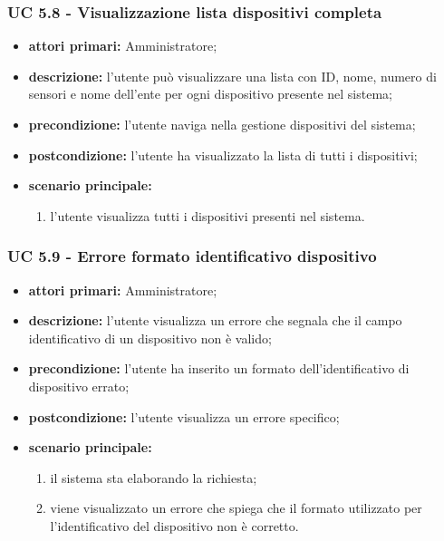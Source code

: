 			\subsubsection{UC 5.8 - Visualizzazione lista dispositivi completa}
			\begin{itemize}
				\item \textbf{attori primari:} Amministratore;
				\item \textbf{descrizione:} l'utente può visualizzare una lista con ID, nome, numero di sensori e nome dell'ente per ogni dispositivo presente nel sistema;
				\item \textbf{precondizione:} l'utente naviga nella gestione dispositivi del sistema;
				\item \textbf{postcondizione:} l'utente ha visualizzato la lista di tutti i dispositivi;
				\item \textbf{scenario principale:}
				\begin{enumerate}
					\item{l'utente visualizza tutti i dispositivi presenti nel sistema.}
				\end{enumerate}
			\end{itemize}

			\subsubsection{UC 5.9 - Errore formato identificativo dispositivo}
			\begin{itemize}
				\item \textbf{attori primari:} Amministratore;
				\item \textbf{descrizione:} l'utente visualizza un errore che segnala che il campo identificativo di un dispositivo non è valido;
				\item \textbf{precondizione:} l'utente ha inserito un formato dell'identificativo di dispositivo errato;
				\item \textbf{postcondizione:} l'utente visualizza un errore specifico;
				\item \textbf{scenario principale:}
				\begin{enumerate}
					\item il sistema sta elaborando la richiesta;
					\item viene visualizzato un errore che spiega che il formato utilizzato per l'identificativo del dispositivo non è corretto.
				\end{enumerate}
			\end{itemize}